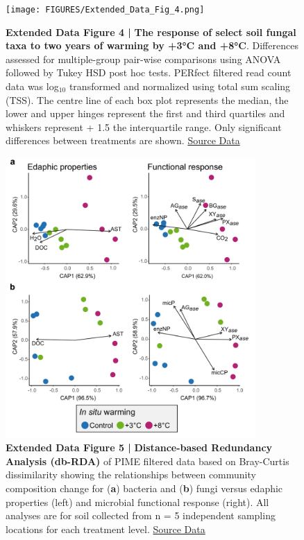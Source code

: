 \documentclass[
  letterpaper,
  DIV=11,
  numbers=noendperiod]{scrartcl}
\begin{document}
\begin{figure}

{\centering \texttt{[image: FIGURES/Extended\_Data\_Fig\_4.png]}

}

\caption{\textbf{Extended Data Figure 4 |}
\textbf{The response of select soil fungal taxa to two years of warming by +3°C and +8°C}.
Differences assessed for multiple-group pair-wise comparisons using
ANOVA followed by Tukey HSD post hoc tests. PERfect filtered read count
data was log\(_{10}\) transformed and normalized using total sum scaling
(TSS). The centre line of each box plot represents the median, the lower
and upper hinges represent the first and third quartiles and whiskers
represent + 1.5 the interquartile range. Only significant differences
between treatments are shown.
\href{https://doi.org/10.25573/data.20263857}{Source Data}}

\end{figure}

\begin{figure}

{\centering \includegraphics[width=0.85\textwidth,height=\textheight]{FIGURES/Extended_Data_Fig_5.png}

}

\caption{\textbf{Extended Data Figure 5 |}
\textbf{Distance-based Redundancy Analysis (db-RDA)} of PIME filtered
data based on Bray-Curtis dissimilarity showing the relationships
between community composition change for (\textbf{a}) bacteria and
(\textbf{b}) fungi versus edaphic properties (left) and microbial
functional response (right). All analyses are for soil collected from n
= 5 independent sampling locations for each treatment level.
\href{https://doi.org/10.25573/data.20263857}{Source Data}}

\end{figure}
\end{document}
